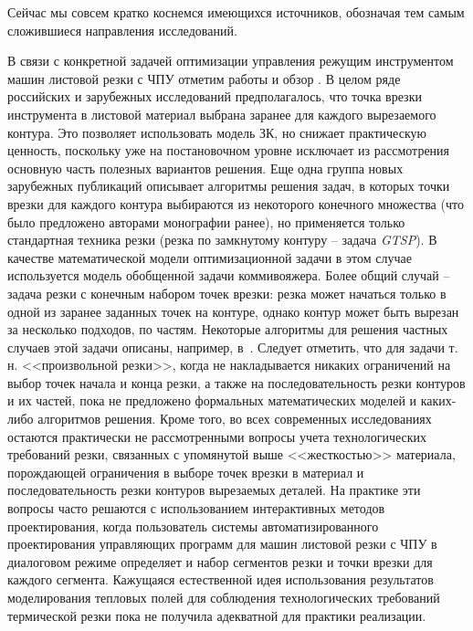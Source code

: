 \documentclass[11pt,twoside,openany]{report}
\begin{document}
Сейчас мы совсем кратко коснемся имеющихся источников,
обозначая тем самым сложившиеся направления исследований.

В связи с конкретной задачей оптимизации управления
режущим инструментом машин листовой резки с ЧПУ
отметим работы
\cite{intro03,intro04,intro05,intro06,intro07,intro08,intro09,Cha10`,intro11,intro12}
и обзор \cite{intro13}.
В целом ряде российских и зарубежных исследований предполагалось,
что точка врезки инструмента в листовой материал
выбрана заранее для каждого вырезаемого контура.
Это позволяет использовать модель ЗК,
но снижает практическую ценность,
поскольку уже на постановочном уровне
исключает из рассмотрения основную часть
полезных вариантов решения.
Еще одна группа новых зарубежных публикаций
описывает алгоритмы решения задач,
в которых точки врезки для каждого контура
выбираются из некоторого конечного множества
(что было предложено авторами монографии ранее),
но применяется только стандартная техника резки
(резка по замкнутому контуру – задача
\textit{GTSP}).
В качестве математической модели оптимизационной задачи
в этом случае используется модель обобщенной задачи коммивояжера.
Более общий случай -- задача резки с конечным набором точек врезки:
резка может начаться только в одной из заранее заданных точек на контуре,
однако контур может быть вырезан за несколько подходов,
по частям.
Некоторые алгоритмы для решения частных случаев
этой задачи описаны, например,
в~\cite{intro12,intro14}.
Следует отметить, что для задачи т. н. <<произвольной резки>>,
когда не накладывается никаких ограничений
на выбор точек начала и конца резки,
а также на последовательность резки контуров и их частей,
пока не предложено формальных математических моделей
и каких-либо алгоритмов решения.
Кроме того, во всех современных исследованиях
остаются практически не рассмотренными
вопросы учета технологических требований резки,
связанных с упомянутой выше <<жесткостью>> материала,
порождающей ограничения в выборе точек врезки в материал
и последовательность резки контуров вырезаемых деталей.
На практике эти вопросы часто решаются
с использованием интерактивных методов проектирования,
когда пользователь системы автоматизированного проектирования
управляющих программ для машин листовой резки с ЧПУ
в диалоговом режиме определяет и набор сегментов резки
и точки врезки для каждого сегмента.
Кажущаяся естественной идея использования результатов
моделирования тепловых полей для соблюдения
технологических требований термической резки
пока не получила адекватной для практики реализации.
\end{document}
